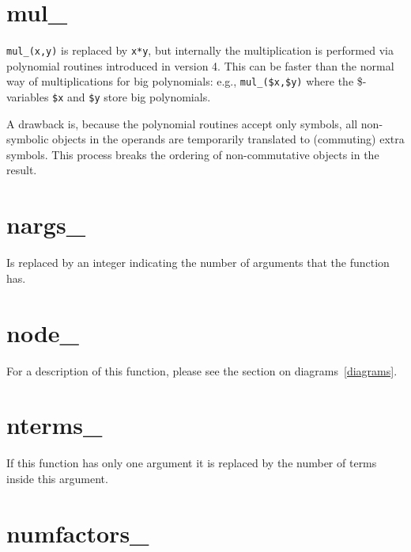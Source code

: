 
\section{mul\_}
\label{funmul}
\noindent \verb|mul_(x,y)| is replaced by \verb|x*y|, but internally
the multiplication is performed via polynomial routines introduced in
\FORM{} version 4. This can be faster than the normal way of multiplications
for big polynomials: e.g., \verb|mul_($x,$y)| where the \$-variables \verb|$x|
and \verb|$y| store big polynomials.

A drawback is, because the polynomial routines accept only symbols, all
non-symbolic objects in the operands are temporarily translated to (commuting)
extra symbols. This process breaks the ordering of non-commutative objects
in the result.


\section{nargs\_}
\label{funnargs}
\noindent Is replaced by an integer indicating the number of 
arguments that the function has.


\section{node\_}
\label{funtonode}
\noindent For a description of this function, please see the section on 
diagrams~\ref{diagrams}.


\section{nterms\_}
\label{funnterms}
\noindent If this function has only one argument it is replaced by 
the number of terms inside this argument.


\section{numfactors\_}
\label{funnumfactors}

